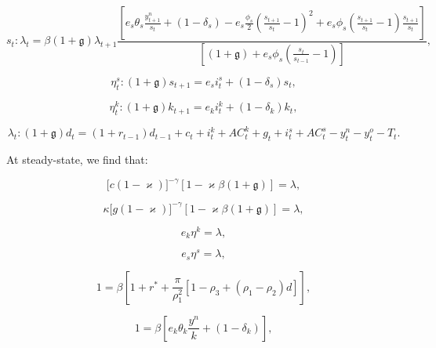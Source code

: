 \documentclass[11pt]{article}
\begin{document}
\begin{equation}
s_{t}:\lambda _{t}=\beta (1+\mathfrak{g})\lambda _{t+1}\frac{\left[
e_{s}\theta _{s}\frac{y_{t+1}^{n}}{s_{t}}+(1-\delta _{s})-e_{s}\frac{\phi
_{s}}{2}\left( \frac{s_{t+1}}{s_{t}}-1\right) ^{2}+e_{s}\phi _{s}\left( 
\frac{s_{t+1}}{s_{t}}-1\right) \frac{s_{t+1}}{s_{t}}\right] }{\left[ (1+%
\mathfrak{g})+e_{s}\phi _{s}\left( \frac{s_{t}}{s_{t-1}}-1\right) \right] },
\label{A7}
\end{equation}

\begin{equation}
\eta _{t}^{s}:(1+\mathfrak{g})s_{t+1}=e_{s}i_{t}^{s}+(1-\delta _{s})s_{t},
\label{A8}
\end{equation}

\begin{equation}
\eta _{t}^{k}:(1+\mathfrak{g})k_{t+1}=e_{k}i_{t}^{k}+(1-\delta _{k})k_{t},
\label{A9}
\end{equation}

\begin{equation}
\lambda _{t}:(1+\mathfrak{g}%
)d_{t}=(1+r_{t-1})d_{t-1}+c_{t}+i_{t}^{k}+AC_{t}^{k}+g_{t}+i_{t}^{s}+AC_{t}^{s}-y_{t}^{n}-y_{t}^{o}-T_{t}.
\label{A10}
\end{equation}

At steady-state, we find that:

\begin{equation}
\lbrack c(1-\varkappa )]^{-\gamma }[1-\varkappa \beta (1+\mathfrak{g}%
)]=\lambda ,  \label{SS1}
\end{equation}

\begin{equation}
\kappa \lbrack g(1-\varkappa )]^{-\gamma }[1-\varkappa \beta (1+\mathfrak{g}%
)]=\lambda ,  \label{SS2}
\end{equation}

\begin{equation}
e_{k}\eta ^{k}=\lambda ,  \label{SS3}
\end{equation}

\begin{equation}
e_{s}\eta ^{s}=\lambda ,  \label{SS4}
\end{equation}

\begin{equation}
1=\beta \left[ 1+r^{\ast }+\frac{\pi }{\rho _{1}^{2}}[1-\rho _{3}+(\rho
_{1}-\rho _{2})d]\right] ,  \label{SS5}
\end{equation}

\begin{equation}
1=\beta \left[ e_{k}\theta _{k}\frac{y^{n}}{k}+(1-\delta _{k})\right] ,
\label{SS6}
\end{equation}
\end{document}
